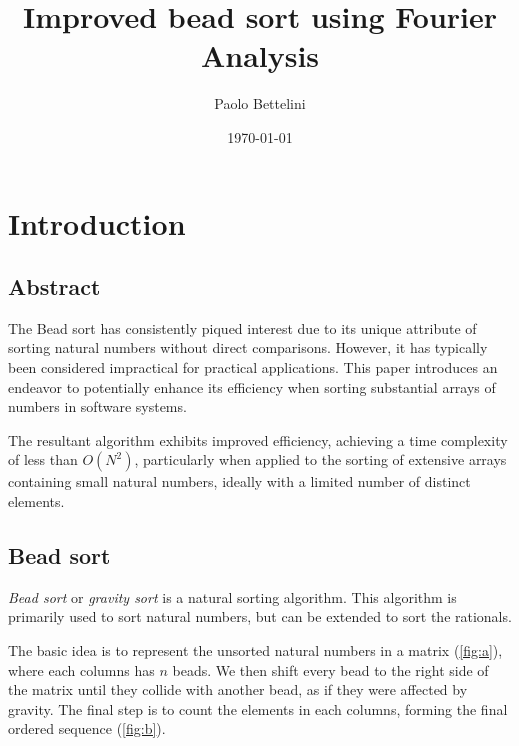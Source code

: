 \documentclass{article}
\title{Improved bead sort using Fourier Analysis}
\author{Paolo Bettelini}
\date{\today}
\begin{document}
\maketitle
\tableofcontents
\pagebreak

\section{Introduction}

\subsection{Abstract}

The Bead sort has consistently piqued interest due to its unique attribute of
sorting natural numbers without direct comparisons.
However, it has typically been considered impractical for practical applications.
This paper introduces an endeavor to potentially enhance its efficiency when
sorting substantial arrays of numbers in software systems.

The resultant algorithm exhibits improved efficiency,
achieving a time complexity of less than \(O(N^2)\), particularly when applied to the sorting of extensive
arrays containing small natural numbers, ideally with a limited number of distinct elements.

\subsection{Bead sort}

\textit{Bead sort}\cite{beadsort} or \textit{gravity sort}
is a natural sorting algorithm.
This algorithm is primarily used to sort
natural numbers, but can be extended to sort the rationals.

The basic idea is to represent the unsorted natural numbers
in a matrix (\ref{fig:a}), where each columns has \(n\) beads.
We then shift every bead to the right side of the matrix
until they collide with another bead,
as if they were affected by gravity.
The final step is to count the elements in each columns,
forming the final ordered sequence (\ref{fig:b}).
\end{document}
